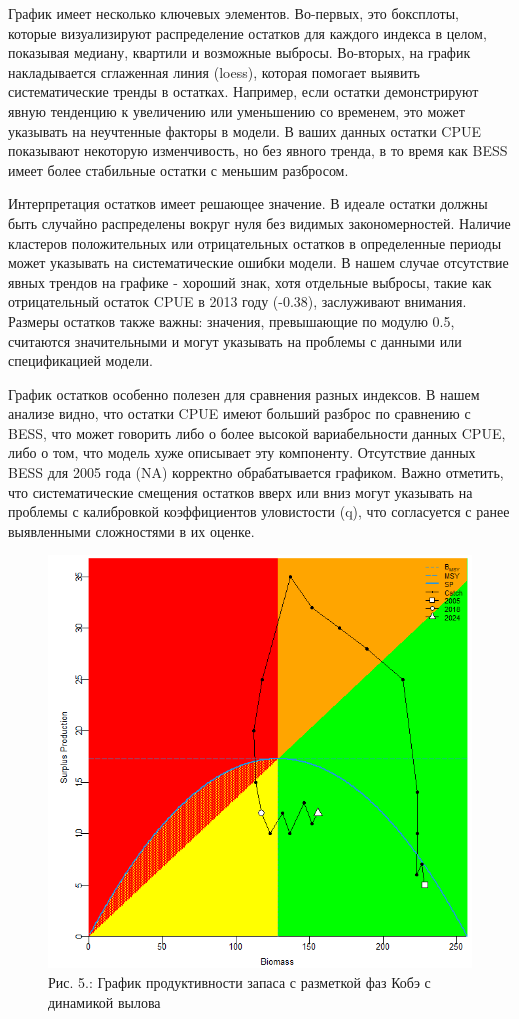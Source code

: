 \documentclass[
  letterpaper,
  DIV=11,
  numbers=noendperiod]{scrreprt}
\begin{document}
График имеет несколько ключевых элементов. Во-первых, это боксплоты,
которые визуализируют распределение остатков для каждого индекса в
целом, показывая медиану, квартили и возможные выбросы. Во-вторых, на
график накладывается сглаженная линия (loess), которая помогает выявить
систематические тренды в остатках. Например, если остатки демонстрируют
явную тенденцию к увеличению или уменьшению со временем, это может
указывать на неучтенные факторы в модели. В ваших данных остатки CPUE
показывают некоторую изменчивость, но без явного тренда, в то время как
BESS имеет более стабильные остатки с меньшим разбросом.

Интерпретация остатков имеет решающее значение. В идеале остатки должны
быть случайно распределены вокруг нуля без видимых закономерностей.
Наличие кластеров положительных или отрицательных остатков в
определенные периоды может указывать на систематические ошибки модели. В
нашем случае отсутствие явных трендов на графике - хороший знак, хотя
отдельные выбросы, такие как отрицательный остаток CPUE в 2013 году
(-0.38), заслуживают внимания. Размеры остатков также важны: значения,
превышающие по модулю 0.5, считаются значительными и могут указывать на
проблемы с данными или спецификацией модели.

График остатков особенно полезен для сравнения разных индексов. В нашем
анализе видно, что остатки CPUE имеют больший разброс по сравнению с
BESS, что может говорить либо о более высокой вариабельности данных
CPUE, либо о том, что модель хуже описывает эту компоненту. Отсутствие
данных BESS для 2005 года (NA) корректно обрабатывается графиком. Важно
отметить, что систематические смещения остатков вверх или вниз могут
указывать на проблемы с калибровкой коэффициентов уловистости (q), что
согласуется с ранее выявленными сложностями в их оценке.

\begin{figure}[H]

{\centering \includegraphics[width=0.6\linewidth,height=\textheight,keepaspectratio]{images/JABBA5.png}

}

\caption{Рис. 5.: График продуктивности запаса с разметкой фаз Кобэ с
динамикой вылова}

\end{figure}%
\end{document}
